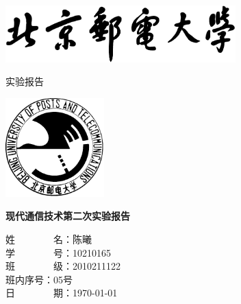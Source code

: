\begin{titlepage}
    \begin{center}
    \includegraphics[width=3.5in]{images/buptname.pdf}
    
    \begin{spacing}{5}
        { 实验报告}
    \end{spacing}

    \includegraphics[width=1.5in]{images/buptseal.pdf}

    \begin{spacing}{1}
        \vspace{2cm}
        \kaishu\textbf{现代通信技术第二次实验报告}
        \vspace{1cm}
    \end{spacing}
    \end{center}

    \hspace{3cm}
    \begin{minipage}{\linewidth}
     \kaishu
        姓~~~~~~~~名：陈曦 \\
        学~~~~~~~~号：10210165\\
        班~~~~~~~~级：2010211122\\
        班内序号：05号\\
        日~~~~~~~~期：\today 
    \end{minipage}
\end{titlepage}
